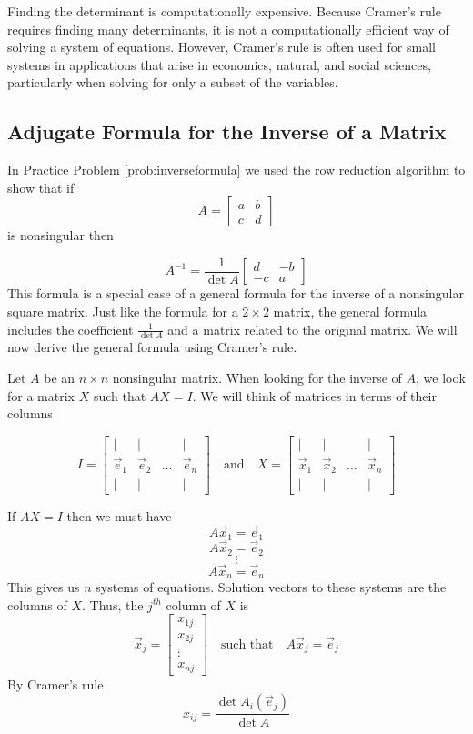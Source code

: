 \documentclass{ximera}
\begin{document}
Finding the determinant is computationally expensive.  Because Cramer's rule requires finding many determinants, it is not a computationally efficient way of solving a system of equations.  However, Cramer's rule is often used for small systems in applications that arise in economics, natural, and social sciences, particularly when solving for only a subset of the variables.
 
\subsection*{Adjugate Formula for the Inverse of a Matrix}
 
In Practice Problem \ref{prob:inverseformula} we used the row reduction algorithm to show that if $$A=\begin{bmatrix}a&b\\c&d\end{bmatrix}$$ is nonsingular then
 
\begin{equation}\label{eq:twobytwoinverse}A^{-1}=\frac{1}{\det{A}}\begin{bmatrix}d&-b\\-c&a\end{bmatrix}\end{equation}
This formula is a special case of a general formula for the inverse of a nonsingular square matrix.  Just like the formula for a $2\times 2$ matrix, the general formula  includes the coefficient $\frac{1}{\det{A}}$ and a matrix related to the original matrix.  We will now derive the general formula using Cramer's rule.
 
Let $A$ be an $n\times n$ nonsingular matrix.  When looking for the inverse of $A$, we look for a matrix $X$ such that $AX=I$.  We will think of matrices in terms of their columns
 
$$I=\begin{bmatrix}
           | & |& &|\\
        \vec{e}_1 & \vec{e}_2&\dots&\vec{e}_n\\
        | & |& &|
         \end{bmatrix}\quad\text{and}\quad X=\begin{bmatrix}
           | & |& &|\\
        \vec{x}_1 & \vec{x}_2&\dots&\vec{x}_n\\
        | & |& &|
         \end{bmatrix}$$
 
If $AX=I$ then we must have
$$A\vec{x}_1=\vec{e}_1$$
$$A\vec{x}_2=\vec{e}_2$$
$$\vdots$$
$$A\vec{x}_n=\vec{e}_n$$
This gives us $n$ systems of equations.  Solution vectors to these systems are the columns of $X$.  Thus, the $j^{th}$ column of $X$ is
$$\vec{x}_j=\begin{bmatrix}x_{1j}\\x_{2j}\\\vdots\\x_{nj}\end{bmatrix}\quad\text{such that}\quad A\vec{x}_j=\vec{e}_j$$
By Cramer's rule
$$x_{ij}=\frac{\det{A_i(\vec{e}_j)}}{\det{A}}$$
          
\end{document}
